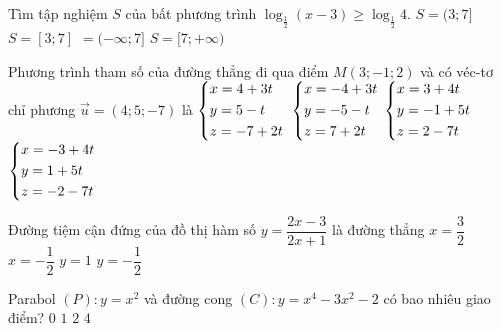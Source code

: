 \begin{ex}%
	Tìm tập nghiệm $S$ của bất phương trình $\log_{\tfrac{1}{2}}(x-3)\ge \log_{\tfrac{1}{2}}4$.	
	\choice
	{\True $S=(3;7]$}
	{$S=[3;7]$}
	{$=(-\infty;7]$}
	{$S=[7;+\infty)$}
\end{ex}
\begin{ex}%
	Phương trình tham số của đường thẳng đi qua điểm $M(3;-1;2)$ và có véc-tơ chỉ phương $\overrightarrow{u}=(4;5;-7)$ là	
	\choice
	{$\left\{\begin{aligned}&x=4+3t\\&y=5-t\\&z=-7+2t\end{aligned}\right.$}
	{$\left\{\begin{aligned}&x=-4+3t\\&y=-5-t\\&z=7+2t\end{aligned}\right.$}
	{\True $\left\{\begin{aligned}&x=3+4t\\&y=-1+5t\\&z=2-7t\end{aligned}\right.$}
	{$\left\{\begin{aligned}&x=-3+4t\\&y=1+5t\\&z=-2-7t\end{aligned}\right.$}
\end{ex}
\begin{ex}%
	Đường tiệm cận đứng của đồ thị hàm số $y=\dfrac{2x-3}{2x+1}$ là đường thẳng
	\choice
	{$x=\dfrac{3}{2}$}
	{\True $x=-\dfrac{1}{2}$}
	{$y=1$}
	{$y=-\dfrac{1}{2}$}
\end{ex}
\begin{ex}%
	Parabol $(P)\colon y=x^2$ và đường cong $(C)\colon y=x^4-3x^2-2$ có bao nhiêu giao điểm?
	\choice
	{$0$}
	{$1$}
	{\True $2$}
	{$4$}
\end{ex}
